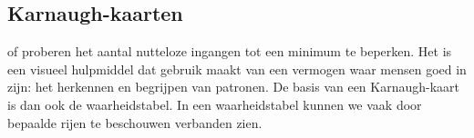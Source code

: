 \subsection{Karnaugh-kaarten}
 of  proberen het aantal nutteloze ingangen tot een minimum te beperken. Het is een visueel hulpmiddel dat gebruik maakt van een vermogen waar mensen goed in zijn: het herkennen en begrijpen van patronen. De basis van een Karnaugh-kaart is dan ook de waarheidstabel. In een waarheidstabel kunnen we vaak door bepaalde rijen te beschouwen verbanden zien.
